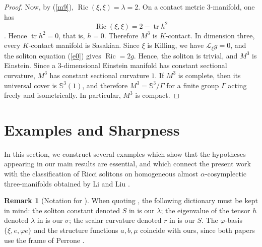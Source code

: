 \documentclass[a4paper, twoside, 10pt]{article}
\numberwithin{equation}{section}
\theoremstyle{definition}
\newtheorem{remark}{Remark}[section]
\begin{document}
\begin{proof}
Now, by (\ref{m9}), $\operatorname{Ric}(\xi,\xi) = \lambda = 2$. On a contact metric
$3$-manifold, one has
\[
\operatorname{Ric}(\xi,\xi)=2-\operatorname{tr}h^2
\]
\cite{blair2002riemannian}. Hence $\operatorname{tr}h^2=0$, that is,
$h=0$. Therefore $M^3$ is $K$-contact. In dimension three, every
$K$-contact manifold is Sasakian. Since $\xi$ is Killing, we have
$\mathcal{L}_\xi g=0$, and the soliton equation (\ref{e0}) gives
$\operatorname{Ric}=2g$. Hence, the soliton is trivial, and $M^3$ is Einstein. Since a
$3$-dimensional Einstein manifold has constant sectional curvature,
$M^3$ has constant sectional curvature $1$. If $M^3$ is complete, then
its universal cover is $\mathbb{S}^3(1)$, and therefore
$M^3=\mathbb{S}^3/\Gamma$ for a finite group $\Gamma$ acting freely and
isometrically. In particular, $M^3$ is compact.
\end{proof}





\bigskip



\section{Examples and Sharpness}\label{sec:examples}




In this section, we construct several examples which show that the
hypotheses appearing in our main results are essential, and which
connect the present work with the classification of Ricci solitons on
homogeneous almost $\alpha$-cosymplectic three-manifolds obtained by
Li and Liu \cite{li2022ricci}.

\begin{remark}[Notation for {\cite{li2022ricci}}]\label{rem:notation}
When quoting \cite{li2022ricci}, the following dictionary must be kept
in mind: the soliton constant denoted $S$ in \cite{li2022ricci} is our
$\lambda$; the eigenvalue of the tensor $h$ denoted $\lambda$ in
\cite{li2022ricci} is our $\sigma$; the scalar curvature denoted $r$
in \cite{li2022ricci} is our $S$. The $\varphi$-basis
$\{\xi, e, \varphi e\}$ and the structure functions $a, b, \mu$
coincide with ours, since both papers use the frame of Perrone
\cite{perrone2018classification}.
\end{remark}

\end{document}
